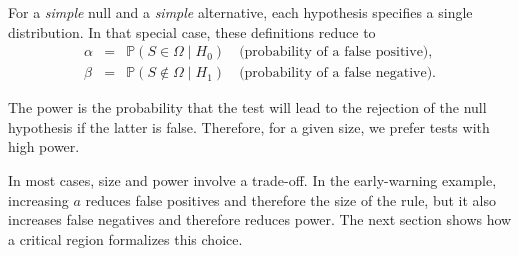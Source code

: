\documentclass[
  11pt,
]{book}
\theoremstyle{definition}
\theoremstyle{definition}
\theoremstyle{definition}
\theoremstyle{definition}
\theoremstyle{remark}
\begin{document}
For a \emph{simple} null and a \emph{simple} alternative, each hypothesis specifies a single distribution. In that special case, these definitions reduce to
\begin{eqnarray}
\alpha &=& \mathbb{P}(S \in \Omega\mid H_0) \quad \mbox{(probability of a false positive)},\\
\beta &=& \mathbb{P}(S \not\in \Omega\mid H_1) \quad \mbox{(probability of a false negative)}.
\end{eqnarray}

The power is the probability that the test will lead to the rejection of the null hypothesis if the latter is false. Therefore, for a given size, we prefer tests with high power.

In most cases, size and power involve a trade-off. In the early-warning example, increasing \(a\) reduces false positives and therefore the size of the rule, but it also increases false negatives and therefore reduces power. The next section shows how a critical region formalizes this choice.
\end{document}
